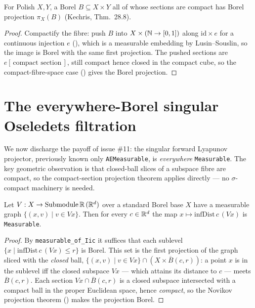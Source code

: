 \begin{theorem}\label{thm:dst-proj}
  \leanok
  For Polish \(X,Y\), a Borel \(B\subseteq X\times Y\) all of whose sections are compact has Borel
  projection \(\pi_X(B)\) (Kechris, Thm.~28.8).
\end{theorem}
\begin{proof}\leanok
  Compactify the fibre: push \(B\) into \(X\times(\mathbb{N}\to[0,1])\) along \(\mathrm{id}\times e\) for a
  continuous injection \(e\) (), which is a measurable embedding by
  Lusin--Souslin, so the image is Borel with the same first projection. The pushed sections are
  \(e[\,\text{compact section}\,]\), still compact hence closed in the compact cube, so the
  compact-fibre-space case () gives the Borel projection.
\end{proof}

\section{The everywhere-Borel singular Oseledets filtration}

We now discharge the payoff of issue \#11: the singular forward Lyapunov projector, previously
known only \texttt{AEMeasurable}, is \emph{everywhere} \texttt{Measurable}. The key geometric
observation is that closed-ball slices of a subspace fibre are compact, so the compact-section
projection theorem applies directly --- no \(\sigma\)-compact machinery is needed.

\begin{theorem}\label{thm:dst-infdist}
  \leanok
  Let \(V:X\to\mathrm{Submodule}\,\mathbb{R}\,(\mathbb{R}^d)\) over a standard Borel base \(X\) have a measurable
  graph \(\{(x,v)\mid v\in V x\}\). Then for every \(c\in\mathbb{R}^d\) the map \(x\mapsto\mathrm{infDist}\,
  c\,(V x)\) is \texttt{Measurable}.
\end{theorem}
\begin{proof}\leanok
  By \texttt{measurable\_of\_Iic} it suffices that each sublevel \(\{x\mid\mathrm{infDist}\,c\,(V
  x)\le r\}\) is Borel. This set is the first projection of the graph sliced with the
  \emph{closed} ball, \(\{(x,v)\mid v\in V x\}\cap(X\times\overline B(c,r))\): a point \(x\) is in
  the sublevel iff the closed subspace \(V x\) --- which attains its distance to \(c\) --- meets
  \(\overline B(c,r)\). Each section \(V x\cap\overline B(c,r)\) is a closed subspace intersected
  with a compact ball in the proper Euclidean space, hence \emph{compact}, so the Novikov
  projection theorem () makes the projection Borel.
\end{proof}

